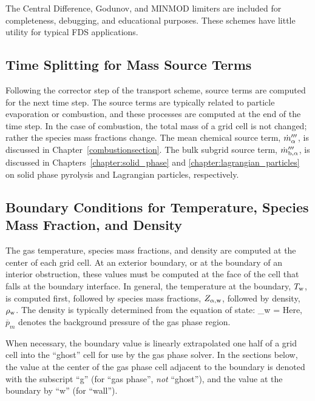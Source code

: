 The Central Difference, Godunov, and MINMOD limiters are included for completeness, debugging, and educational purposes.  These schemes have little utility for typical FDS applications.

\subsection{Time Splitting for Mass Source Terms}
\label{sec_time_splitting}

Following the corrector step of the transport scheme, source terms are computed for the next time step.  The source terms are typically related to particle evaporation or combustion, and these processes are computed at the end of the time step. In the case of combustion, the total mass of a grid cell is not changed; rather the species mass fractions change. The mean chemical source term, $\dot{m}_{\alpha}'''$, is discussed in Chapter~\ref{combustionsection}.  The bulk subgrid source term, $\dot{m}_{\rm b,\alpha}'''$, is discussed in Chapters~\ref{chapter:solid_phase} and \ref{chapter:lagrangian_particles} on solid phase pyrolysis and Lagrangian particles, respectively.


\subsection{Boundary Conditions for Temperature, Species Mass Fraction, and Density}
\label{section:TZD_bc}

The gas temperature, species mass fractions, and density are computed at the center of each grid cell. At an exterior boundary, or at
the boundary of an interior obstruction, these values must be computed at the face of the cell that falls at the boundary interface. In general, the temperature at the boundary, $T_{\rm w}$, is computed first, followed by species mass fractions, $Z_{\rm \alpha,w}$, followed by density, $\rho_{\rm w}$. The density is typically determined from the equation of state:
\be  \rho_{\rm w} =   \ee
Here, $\overline{p}_m$ denotes the background pressure of the gas phase region.

When necessary, the boundary value is linearly extrapolated one half of a grid cell into the ``ghost'' cell for use by the gas phase solver. In the sections below, the value at the center of the gas phase cell adjacent to the boundary is denoted with the subscript ``g'' (for ``gas phase'', \emph{not} ``ghost''), and the value at the boundary by ``w'' (for ``wall'').

